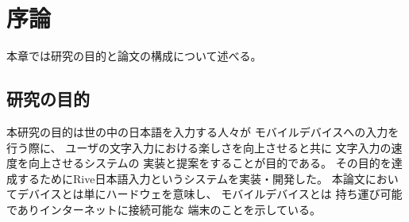 \chapter{序論}
\label{chap:introduction}
本章では研究の目的と論文の構成について述べる。

\newpage
\section{研究の目的}
本研究の目的は世の中の日本語を入力する人々が
モバイルデバイスへの入力を行う際に、
ユーザの文字入力における楽しさを向上させると共に
文字入力の速度を向上させるシステムの
実装と提案をすることが目的である。
その目的を達成するためにRive日本語入力というシステムを実装・開発した。
本論文においてデバイスとは単にハードウェを意味し、
モバイルデバイスとは
持ち運び可能でありインターネットに接続可能な
端末のことを示している。


